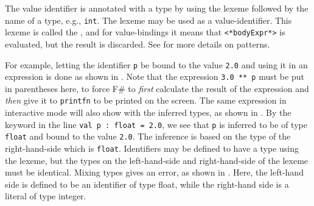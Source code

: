 \documentclass[fsharpNotes.tex]{subfiles}
\begin{document}
The value identifier is annotated with a type by using the \idx[:@\lstinline{:}]{\lexeme{:}} lexeme followed by the name of a type, e.g., \lstinline{int}. The \idx[\_@\lstinline{_}]{\lexeme{\_}} lexeme may be used as a value-identifier. This lexeme is called the , and for value-bindings it means that \lstinline[language=syntax]{<*bodyExpr*>} is evaluated, but the result is discarded. See  for more details on patterns.

For example, letting the identifier \lstinline!p! be bound to the value \lstinline!2.0! and using it in an expression is done as shown in .
%
%
Note that the expression \lstinline{3.0 ** p} must be put in parentheses here, to force F\# to \emph{first} calculate the result of the expression and \emph{then} give it to \lstinline{printfn} to be printed on the screen. The same expression in interactive mode will also show with the inferred types, as shown in .
%
%
By the  keyword in the line \lstinline!val p : float = 2.0!, we see that \lstinline!p! is inferred to be of type \lstinline!float! and bound to the value \lstinline!2.0!. The inference is based on the type of the right-hand-side which is \lstinline!float!.  Identifiers may be defined to have a type using the \lexeme{:} lexeme, but the types on the left-hand-side and right-hand-side of the \lexeme{=} lexeme must be identical. Mixing types gives an error, as shown in .
%
%
%
Here, the left-hand side is defined to be an identifier of type float, while the right-hand side is a literal of type integer.

\end{document}
